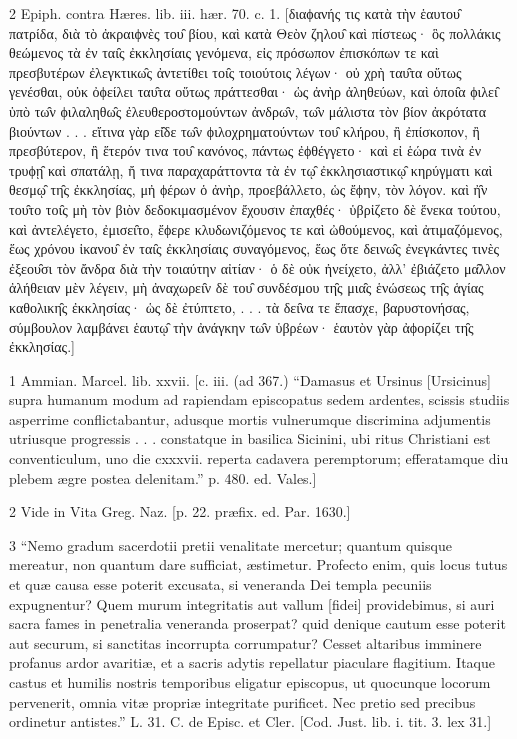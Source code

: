 2
Epiph. contra Hæres. lib. iii. hær. 70. c. 1. [διαϕανής τις κατὰ τὴν ἑαυτου̑ πατρίδα, διὰ τὸ ἀκραιϕνὲς του̑ βίου, καὶ κατὰ Θεὸν ζηλου̑ καὶ πίστεως· ὃς πολλάκις θεώμενος τὰ ἐν ται̑ς ἐκκλησίαις γενόμενα, εἰς πρόσωπον ἐπισκόπων τε καὶ πρεσβυτέρων ἐλεγκτικω̑ς ἀντετίθει τοι̑ς τοιούτοις λέγων· οὐ χρὴ ταυ̑τα οὕτως γενέσθαι, οὐκ ὀϕείλει ταυ̑τα οὕτως πράττεσθαι· ὡς ἀνὴρ ἀληθεύων, καὶ ὁποι̑α ϕιλει̑ ὑπὸ τω̑ν ϕιλαληθω̑ς ἐλευθεροστομούντων ἀνδρω̑ν, τω̑ν μάλιστα τὸν βίον ἀκρότατα βιούντων . . . εἴτινα γὰρ εἰ̑δε τω̑ν ϕιλοχρηματούντων του̑ κλήρου, ἢ ἐπίσκοπον, ἢ πρεσβύτερον, ἢ ἕτερόν τινα του̑ κανόνος, πάντως ἐϕθέγγετο· καὶ εἰ ἑώρα τινὰ ἐν τρυϕῃ̑ καὶ σπατάλῃ, ἤ τινα παραχαράττοντα τὰ ἐν τῳ̑ ἐκκλησιαστικῳ̑ κηρύγματι καὶ θεσμῳ̑ τη̑ς ἐκκλησίας, μἠ ϕέρων ὁ ἀνὴρ, προεβάλλετο, ὡς ἔϕην, τὸν λόγον. καὶ ἠ̑ν του̑το τοι̑ς μὴ τὸν βιὸν δεδοκιμασμένον ἔχουσιν ἐπαχθές· ὑβρἰζετο δὲ ἕνεκα τούτου, καὶ ἀντελέγετο, ἐμισει̑το, ἔϕερε κλυδωνιζόμενος τε καὶ ὠθούμενος, καὶ ἀτιμαζόμενος, ἕως χρόνου ἱκανου̑ ἐν ται̑ς ἐκκλησίαις συναγόμενος, ἕως ὅτε δεινω̑ς ἐνεγκάντες τινὲς ἐξεου̑σι τὸν ἄνδρα διὰ τὴν τοιαύτην αἰτίαν· ὁ δὲ οὐκ ἠνείχετο, ἀλλ’ ἐβιάζετο μα̑λλον ἀλήθειαν μὲν λέγειν, μὴ ἀναχωρει̑ν δὲ του̑ συνδέσμου τη̑ς μια̑ς ἑνώσεως τη̑ς ἁγίας καθολικη̑ς ἐκκλησίας· ὡς δὲ ἐτύπτετο, . . . τὰ δει̑να τε ἔπασχε, βαρυστονήσας, σύμβουλον λαμβάνει ἑαυτῳ̑ τὴν ἀνάγκην τω̑ν ὑβρέων· ἑαυτὸν γὰρ ἀϕορίζει τη̑ς ἐκκλησίας.]

1
Ammian. Marcel. lib. xxvii. [c. iii. (ad 367.) “Damasus et Ursinus [Ursicinus] supra humanum modum ad rapiendam episcopatus sedem ardentes, scissis studiis asperrime conflictabantur, adusque mortis vulnerumque discrimina adjumentis utriusque progressis . . . constatque in basilica Sicinini, ubi ritus Christiani est conventiculum, uno die cxxxvii. reperta cadavera peremptorum; efferatamque diu plebem ægre postea delenitam.” p. 480. ed. Vales.]

2
Vide in Vita Greg. Naz. [p. 22. præfix. ed. Par. 1630.]

3
“Nemo gradum sacerdotii pretii venalitate mercetur; quantum quisque mereatur, non quantum dare sufficiat, æstimetur. Profecto enim, quis locus tutus et quæ causa esse poterit excusata, si veneranda Dei templa pecuniis expugnentur? Quem murum integritatis aut vallum [fidei] providebimus, si auri sacra fames in penetralia veneranda proserpat? quid denique cautum esse poterit aut securum, si sanctitas incorrupta corrumpatur? Cesset altaribus imminere profanus ardor avaritiæ, et a sacris adytis repellatur piaculare flagitium. Itaque castus et humilis nostris temporibus eligatur episcopus, ut quocunque locorum pervenerit, omnia vitæ propriæ integritate purificet. Nec pretio sed precibus ordinetur antistes.” L. 31. C. de Episc. et Cler. [Cod. Just. lib. i. tit. 3. lex 31.]

